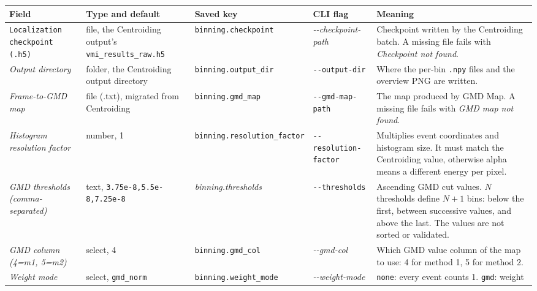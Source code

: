 \documentclass[11pt,a4paper]{article}
\newcommand{\code}[1]{\texttt{#1}}
\begin{document}
\begin{center}
\footnotesize
\begin{longtable}{@{}L{3.4cm}L{2.3cm}L{2.5cm}L{2.8cm}L{4.9cm}@{}}
\toprule
Field & Type and default & Saved key & CLI flag & Meaning \\
\midrule
\endhead
\bottomrule
\endfoot
\code{Localization checkpoint (.h5)} & file, the Centroiding output's
\code{vmi\_\allowbreak{}results\_\allowbreak{}raw.h5} & \code{binning.\allowbreak{}checkpoint} &
\emph{-\allowbreak{}-\allowbreak{}checkpoint-\allowbreak{}path} & Checkpoint written by the Centroiding batch. A
missing file fails with \emph{Checkpoint not found}. \\
\addlinespace
\emph{Output directory} & folder, the Centroiding output directory &
\code{binning.output\_\allowbreak{}dir} & \code{-\allowbreak{}-\allowbreak{}output-\allowbreak{}dir} & Where the per-bin
\code{.npy} files and the overview PNG are written. \\
\addlinespace
\emph{Frame-\allowbreak{}to-\allowbreak{}GMD map} & file (.txt), migrated from Centroiding &
\code{binning.gmd\_\allowbreak{}map} & \code{-\allowbreak{}-\allowbreak{}gmd-\allowbreak{}map-\allowbreak{}path} & The map produced by GMD
Map. A missing file fails with \emph{GMD map not found}. \\
\addlinespace
\emph{Histogram resolution factor} & number, 1 &
\code{binning.resolution\_\allowbreak{}factor} & \code{-\allowbreak{}-\allowbreak{}resolution-\allowbreak{}factor} & Multiplies
event coordinates and histogram size. It must match the Centroiding value,
otherwise alpha means a different energy per pixel. \\
\addlinespace
\emph{GMD thresholds (comma-\allowbreak{}separated)} & text, \code{3.\allowbreak{}75e-\allowbreak{}8,5.\allowbreak{}5e-\allowbreak{}8,7.\allowbreak{}25e-\allowbreak{}8} &
\emph{binning.thresholds} & \code{-\allowbreak{}-\allowbreak{}thresholds} & Ascending GMD cut values.
$N$ thresholds define $N+1$ bins: below the first, between successive values,
and above the last. The values are not sorted or validated. \\
\addlinespace
\emph{GMD column (4=m1, 5=m2)} & select, 4 & \code{binning.\allowbreak{}gmd\_\allowbreak{}col} &
\emph{-\allowbreak{}-\allowbreak{}gmd-\allowbreak{}col} & Which GMD value column of the map to use: 4 for method 1,
5 for method 2. \\
\addlinespace
\emph{Weight mode} & select, \code{gmd\_\allowbreak{}norm} & \code{binning.\allowbreak{}weight\_\allowbreak{}mode} &
\emph{-\allowbreak{}-\allowbreak{}weight-\allowbreak{}mode} & \code{none}: every event counts 1. \code{gmd}: weight

\end{longtable}
\end{center}
\end{document}
